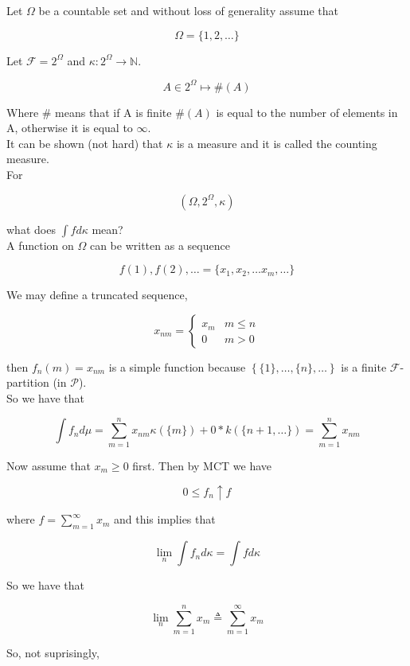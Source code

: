\documentclass[11pt,fleqn]{book} %
\begin{document}
\begin{example}
	Let $\Omega$ be a countable set and without loss of generality assume that

			$$\Omega = \{1, 2, \dots \} $$

	Let $\mathcal{F} = 2^\Omega$ and $\kappa: 2^\Omega \rightarrow \mathbb{N}$. 

			$$A \in 2^\Omega \mapsto \#(A) $$

	Where \# means that if A is finite $\#(A)$ is equal to the number of elements in A, otherwise it is equal to $\infty$.\\

	It can be shown (not hard) that $\kappa$ is a measure and it is called the counting measure.\\

	For 

			$$(\Omega, 2^\Omega, \kappa) $$

	what does $\int f d\kappa$ mean?\\

	A function on $\Omega$ can be written as a sequence 

			$$f(1), f(2), \dots = \{x_1, x_2, \dots x_m,  \dots\} $$

	We may define a truncated sequence, 


			$$x_{nm} = \left\{ \begin{array}{ll}
				x_m & m \leq n\\
				0 & m > 0
			\end{array}
			\right. $$

	then $f_n(m) = x_{nm}$ is a simple function because $\left\{\{1\}, \dots, \{n\}, \dots \right\}$ is a finite $\mathcal{F}$-partition (in $\mathcal{P}$). \\

	So we have that 

			$$\int f_n d\mu = \sum^n_{m=1} x_{nm} \kappa(\{m\}) + 0 * k(\{n+1, \dots\}) = \sum^n_{m=1} x_{nm} $$

	Now assume that $x_m \geq 0$ first. Then by MCT we have

			$$0 \leq f_n \uparrow f $$

	where $f = \sum^\infty_{m=1} x_m$ and this implies that 

			$$\lim_n \int f_n d\kappa = \int f d\kappa$$

	So we have that 

			$$\lim_n \sum^n_{m=1} x_m \triangleq \sum^\infty_{m=1} x_m $$

	So, not suprisingly, 


\end{example}
\end{document}
